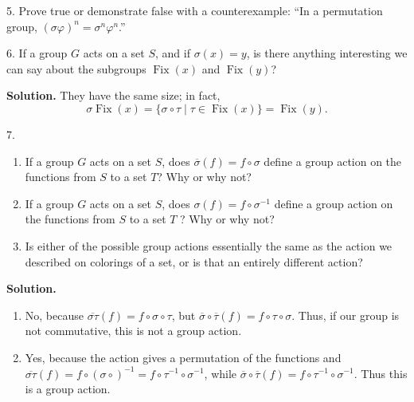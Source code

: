 \documentclass[10pt,]{book}
\theoremstyle{plain}
\theoremstyle{definition}
\theoremstyle{definition}
\numberwithin{equation}{chapter}
\DeclareMathOperator{\Fix}{Fix}
\begin{document}
\begin{exerciselist}
\item[5.]\hypertarget{exercise-58}{}Prove true or demonstrate false with a counterexample: ``In a permutation group, \((\sigma\varphi)^n = \sigma^n\varphi^n\).''%
\par\smallskip
\item[6.]\hypertarget{exercise-59}{}If a group \(G\) acts on a set \(S\), and if \(\sigma(x) =y\), is there anything interesting we can say about the subgroups \(\Fix(x)\) and \(\Fix(y)\)?%
\par\smallskip
\par\smallskip
\noindent\textbf{Solution.}\hypertarget{solution-525}{}\quad
They have the same size; in fact,%
\begin{equation*}
\sigma\Fix(x) = \{\sigma\circ\tau\mid\tau\in\Fix(x)\} = \Fix(y)\text{.}
\end{equation*}
%
\item[7.]\hypertarget{exercise-60}{}\leavevmode%
\begin{enumerate}[label=(\alph*)]
\item\hypertarget{li-121}{}If a group \(G\) acts on a set \(S\), does \(\overline{\sigma}(f) = f\circ\sigma\) define a group action on the functions from \(S\) to a set \(T\)? Why or why not?%
\item\hypertarget{li-122}{}If a group \(G\) acts on a set \(S\), does \(\sigma(f)=f\circ\sigma^{-1}\) define a group action on the functions from \(S\) to a set \(T\) ? Why or why not?%
\item\hypertarget{li-123}{}Is either of the possible group actions essentially the same as the action we described on colorings of a set, or is that an entirely different action?%
\end{enumerate}
%
\par\smallskip
\par\smallskip
\noindent\textbf{Solution.}\hypertarget{solution-526}{}\quad
\leavevmode%
\begin{enumerate}[label=(\alph*)]
\item\hypertarget{li-124}{}No, because \(\overline{\sigma\tau}(f) = f\circ\sigma\circ\tau\), but \(\overline{\sigma}\circ\overline{\tau}(f) = f\circ\tau\circ\sigma\). Thus, if our group is not commutative, this is not a group action.%
\item\hypertarget{group-act-comp}{}Yes, because the action gives a permutation of the functions and \(\overline{\sigma\tau}(f) = f\circ(\sigma\circ)^{-1} = f\circ\tau^{-1}\circ\sigma^{-1}\), while \(\overline{\sigma}\circ\overline{\tau}(f) = f\circ\tau^{-1}\circ\sigma^{-1}\). Thus this is a group action.%

\end{enumerate}
\end{exerciselist}
\end{document}
